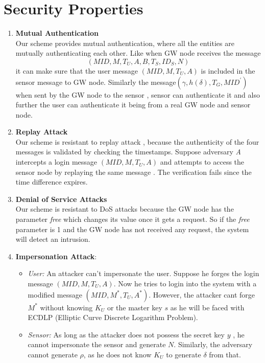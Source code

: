 \documentclass[a4paper,12pt]{report}
\begin{document}
\section{Security Properties}
\begin{enumerate}
\item\textbf{Mutual Authentication}\\ Our scheme provides mutual authentication, where all the entities are mutually authenticating each other. Like when GW node receives the message\\
$$(MID, M, T_{U}, A, B, T_{S}, ID_{S}, N)$$
it can make sure that the user message $(MID, M, T_{U}, A)$ is included in the sensor message to GW node. Similarly the message$(\gamma, h(\delta), T_{G}, MID^{\prime})$ when sent by the GW node to the sensor , sensor can authenticate it and also further the user can authenticate it being from a real GW node and sensor node.\\
\smallskip
\item\textbf{Replay Attack}\\ Our scheme is resistant to replay attack , because the authenticity of the four messages is validated by checking the timestamps. Suppose adversary \textit{A} intercepts a login message $(MID, M, T_{U}, A)$ and attempts to access the sensor node by replaying the same message . The verification fails since the time difference expires.\\
\item \textbf{Denial of Service Attacks}\\ Our scheme is resistant to DoS attacks because the GW node has the parameter \textit{free} which changes its value once it gets a request. So if the \textit{free} parameter is 1 and the GW node has not received any request, the system will detect an intrusion.\\
\smallskip
\item\textbf{Impersonation Attack}:
\begin{itemize}
\item \textit{User:} An attacker can't impersonate the user. Suppose he forges the login message $(MID,M,T_{U},A)$. Now he tries to login into the system with a modified message $(MID,M^{*},T_{U},A^{*})$. However, the attacker cant forge $M^{*}$ without knowing $K_U$ or the master key $s$ as he will be faced with ECDLP (Elliptic Curve Discrete Logarithm Problem).
\item \textit{Sensor:} As long as the attacker does not possess the secret key $y$ , he cannot impersonate the sensor and generate $N$. Similarly, the adversary cannot generate $\rho$, as he does not know $K_U$ to generate $\delta$ from that.

\end{itemize}
\end{enumerate}
\end{document}
